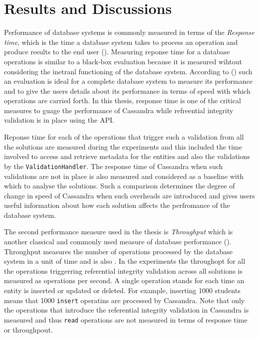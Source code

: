 \chapter{Results and Discussions}

Performance of database systems is commonly measured in terms of the
\textit{Response time}, which is the time  a database system takes to process an
operation and produce results to the end user (). Measuring
reponse time for a database operations is similar to a black-box evaluation
because it is measured  wihtout considering the inetranl functioning  of the
database system. According to () such an evaluation is
ideal for a complete database system to measure its performance and to give the
users details about its performance in terms of speed with which operations are
carried forth. In this thesis, response time is one of the critical measures to
guage the performance of Cassandra while refreential integrity validation
is in place using the \ac{API}. 

Reponse time for each of the  operations that trigger such a validation from all
the solutions are measured during the experiments and this included the time
involved to access and retrieve metadata for the entities and also the
validations by the \texttt{ValidationHandler}. The response time of Cassandra
when such validations are not in place is also measured and considered as a
baseline with which to analyse the solutions. Such a comparison  determines the degree of
change in speed of Cassandra when such overheads are introduced and gives 
users useful information about how each solution affects the perfromance of
the database system.

The second performance measure used in the thesis is \textit{Throughput} which
is another classical and commonly used measure of database performance
().
Throughput measures the number of operations processed by the database system in a unit of
time and is also . In the experiments the throughopt for all the operations
triggerring referential integrity validation across all solutions is measured
as operations per second.
A single operation stands for each time an entity is inserted or updated or
deleted. For example, inserting 1000 students means that 1000 \texttt{insert}
operatins are processed by Cassandra. Note that only the operations that
introduce the referential integrity validation in Cassandra is measured and thus
\texttt{read} operations are not measured in terms of response time or
throughpout.

